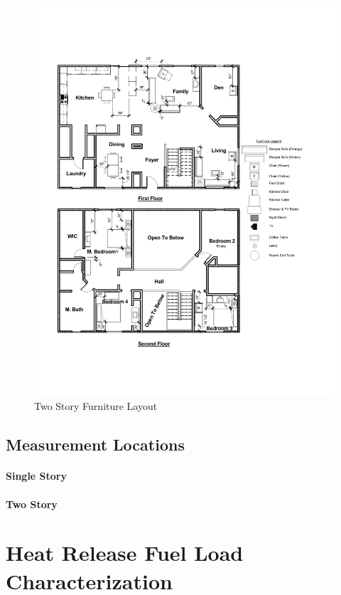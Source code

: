 \documentclass{article}
\begin{document}
\begin{figure}[H]
	\centering
	\includegraphics[width=\textwidth]{0_Images/Furniture/Two_Story_Furniture_Layout.pdf}
	\caption{Two Story Furniture Layout}
	\label{fig:TwoStoryFurniture}
\end{figure}

\subsection{Measurement Locations}

\paragraph{Single Story} \mbox{}

\paragraph{Two Story} \mbox{}


\section{Heat Release Fuel Load Characterization} \mbox{}
\end{document}
